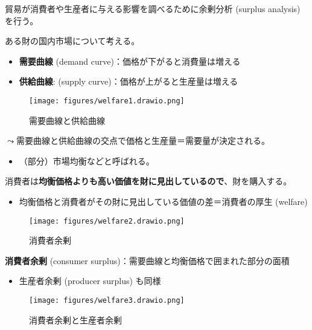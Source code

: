 \documentclass[
  xelatex,
  ja=standard]{bxjsarticle}
\providecommand{\tightlist}{%
  \setlength{\itemsep}{0pt}\setlength{\parskip}{0pt}}\usepackage{longtable,booktabs,array}
\begin{document}
貿易が消費者や生産者に与える影響を調べるために余剰分析 (surplus
analysis) を行う。

ある財の国内市場について考える。

\begin{itemize}
\tightlist
\item
  \textbf{需要曲線} (demand curve)：価格が下がると消費量は増える
\item
  \textbf{供給曲線}: (supply curve)：価格が上がると生産量は増える
\end{itemize}

\begin{figure}[htpb]

{\centering \texttt{[image: figures/welfare1.drawio.png]}

}

\caption{需要曲線と供給曲線}

\end{figure}

\(\leadsto\)需要曲線と供給曲線の交点で価格と生産量＝需要量が決定される。

\begin{itemize}
\tightlist
\item
  （部分）市場均衡などと呼ばれる。
\end{itemize}

消費者は\textbf{均衡価格よりも高い価値を財に見出しているので}、財を購入する。

\begin{itemize}
\tightlist
\item
  均衡価格と消費者がその財に見出している価値の差＝消費者の厚生 (welfare)
\end{itemize}

\begin{figure}[htpb]

{\centering \texttt{[image: figures/welfare2.drawio.png]}

}

\caption{消費者余剰}

\end{figure}

\textbf{消費者余剰} (consumer
surplus)：需要曲線と均衡価格で囲まれた部分の面積

\begin{itemize}
\tightlist
\item
  生産者余剰 (producer surplus) も同様
\end{itemize}

\begin{figure}[htpb]

{\centering \texttt{[image: figures/welfare3.drawio.png]}

}

\caption{消費者余剰と生産者余剰}

\end{figure}
\end{document}
